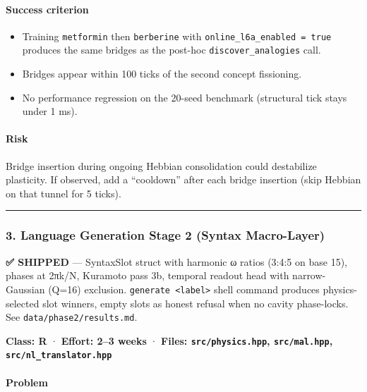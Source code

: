 \documentclass[
  11pt,
  a4paper,
]{article}
\providecommand{\tightlist}{%
  \setlength{\itemsep}{0pt}\setlength{\parskip}{0pt}}
\begin{document}
\paragraph{Success criterion}\label{success-criterion-1}

\begin{itemize}
\tightlist
\item
  Training \texttt{metformin} then \texttt{berberine} with
  \texttt{online\_l6a\_enabled\ =\ true} produces the same bridges as
  the post-hoc \texttt{discover\_analogies} call.
\item
  Bridges appear within 100 ticks of the second concept fissioning.
\item
  No performance regression on the 20-seed benchmark (structural tick
  stays under 1 ms).
\end{itemize}

\paragraph{Risk}\label{risk}

Bridge insertion during ongoing Hebbian consolidation could destabilize
plasticity. If observed, add a ``cooldown'' after each bridge insertion
(skip Hebbian on that tunnel for 5 ticks).

\begin{center}\rule{0.5\linewidth}{0.5pt}\end{center}

\subsubsection{3. Language Generation Stage 2 (Syntax
Macro-Layer)}\label{language-generation-stage-2-syntax-macro-layer}

\textbf{✅ SHIPPED} --- SyntaxSlot struct with harmonic ω ratios (3:4:5
on base 15), phases at 2πk/N, Kuramoto pass 3b, temporal readout head
with narrow-Gaussian (Q=16) exclusion.
\texttt{generate\ \textless{}label\textgreater{}} shell command produces
physics-selected slot winners, empty slots as honest refusal when no
cavity phase-locks. See \texttt{data/phase2/results.md}.

\textbf{Class: R} · \textbf{Effort: 2--3 weeks} · \textbf{Files:
\texttt{src/physics.hpp}, \texttt{src/mal.hpp},
\texttt{src/nl\_translator.hpp}}

\paragraph{Problem}\label{problem-2}
\end{document}
